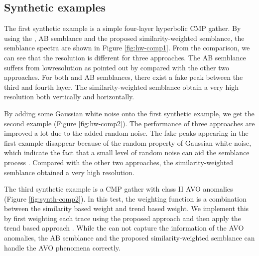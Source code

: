 \subsection{Synthetic examples}
The first synthetic example is a simple four-layer hyperbolic CMP gather. By using the , AB semblance and the proposed similarity-weighted semblance, the semblance spectra are shown in Figure \ref{fig:hw-comp1}. From the comparison, we can see that the resolution is  different for three approaches. The AB semblance suffers from  low\new{-}resolution  as pointed out by \cite{fomel20091}\new{,} compared with the other two approaches. For both  and AB semblances, there exist a fake peak between the third and fourth layer. The similarity-weighted semblance obtain a very high resolution both vertically and horizontally.  

By adding some Gaussian white noise onto the first synthetic example, we get the second example (Figure \ref{fig:hw-comp2}). The performance of  three approaches are improved a lot due to the added random noise. The fake peaks appearing in the first example disappear because of the random property of Gaussian white noise, which indicate the fact that a small level of random noise can aid  the semblance  process . Compared with the other two approaches, the similarity-weighted semblance obtained a very high resolution.  

The third synthetic example is a CMP gather with class II AVO anomalies (Figure \ref{fig:synth-comp2}).   In this test, the weighting function is a combination between the similarity based weight and trend based weight. We implement this by first weighting each trace using the proposed approach and then apply the trend based approach \cite[]{fomel20091}. While the  can not capture the information of the AVO anomalies, the AB semblance and the proposed similarity-weighted semblance can handle the AVO phenomena correctly.    

